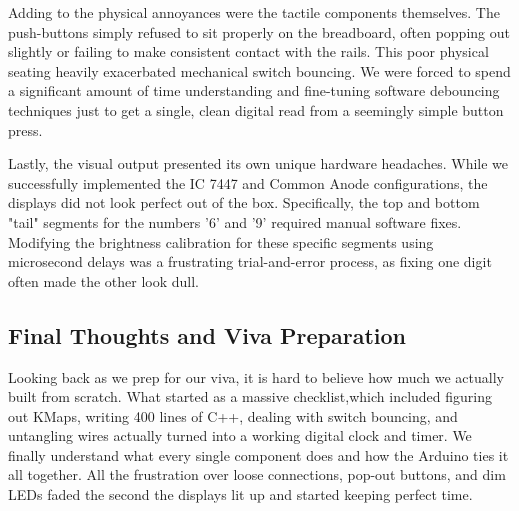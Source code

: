 \documentclass[journal,12pt,onecolumn]{IEEEtran}
\begin{document}
		
		Adding to the physical annoyances were the tactile components themselves. The push-buttons simply refused to sit properly on the breadboard, often popping out slightly or failing to make consistent contact with the rails. This poor physical seating heavily exacerbated mechanical switch bouncing. We were forced to spend a significant amount of time understanding and fine-tuning software debouncing techniques just to get a single, clean digital read from a seemingly simple button press.
		
		
		Lastly, the visual output presented its own unique hardware headaches. While we successfully implemented the IC 7447 and Common Anode configurations, the displays did not look perfect out of the box. Specifically, the top and bottom "tail" segments for the numbers '6' and '9' required manual software fixes. Modifying the brightness calibration for these specific segments using microsecond delays was a frustrating trial-and-error process, as fixing one digit often made the other look dull.
		
		\subsection{Final Thoughts and Viva Preparation}
		Looking back as we prep for our viva, it is hard to believe how much we actually built from scratch. What started as a massive checklist,which included figuring out KMaps, writing 400 lines of C++, dealing with switch bouncing, and untangling wires actually turned into a working digital clock and timer. We finally understand what every single component does and how the Arduino ties it all together. All the frustration over loose connections, pop-out buttons, and dim LEDs faded the second the displays lit up and started keeping perfect time.
		\newpage
\end{document}
